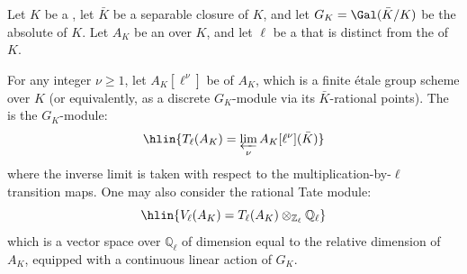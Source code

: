 \begin{definition} \label{definition:ell_adic_tate_module_of_an_abelian_variety_over_a_field}
    Let $K$ be a , let $\bar{K}$ be a separable closure of $K$, and let $G_K = \Gal(\bar{K}/K)$ be the absolute  of $K$. Let $A_K$ be an  over $K$, and let $\ell$ be a  that is distinct from the  of $K$.

    For any integer $\nu \geq 1$, let $A_K[\ell^\nu]$ be  of $A_K$, which is a finite étale group scheme over $K$ (or equivalently, as a discrete $G_K$-module via its $\bar{K}$-rational points). The  is the $G_K$-module:
    $$\hlin{T_\ell(A_K) = \varprojlim_{\nu} A_K[\ell^\nu](\bar{K})}$$
    where the inverse limit is taken with respect to the multiplication-by-$\ell$ transition maps. One may also consider the rational Tate module:
    $$\hlin{V_\ell(A_K) = T_\ell(A_K) \otimes_{\mathbb{Z}_\ell} \mathbb{Q}_\ell}$$
    which is a vector space over $\mathbb{Q}_\ell$ of dimension equal to the relative dimension of $A_K$, equipped with a continuous linear action of $G_K$.
\end{definition}

